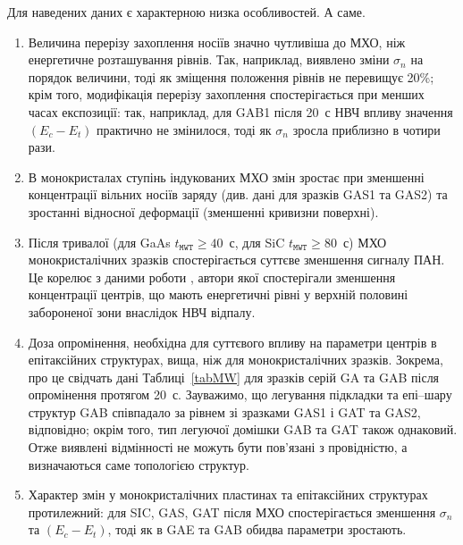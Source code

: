 \documentclass[a4paper,14pt,oneside,openany]{memoir}
\begin{document}
Для наведених даних є характерною низка особливостей.
А саме.
\begin{enumerate}[label=\arabic*),leftmargin=0em,itemindent=1.5em]
\item Величина перерізу захоплення носіїв значно чутливіша до МХО, ніж енергетичне розташування рівнів.
Так, наприклад, виявлено зміни $\sigma_n$ на порядок величини, тоді як зміщення положення рівнів не перевищує 20\%;
крім того, модифікація перерізу захоплення спостерігається при менших часах експозиції: так, наприклад,
для GAB1 після 20~с НВЧ впливу значення $(E_c-E_t)$ практично не змінилося, тоді як $\sigma_n$ зросла приблизно в чотири рази.

\item В монокристалах ступінь індукованих МХО змін зростає при зменшенні концентрації вільних носіїв заряду (див. дані для зразків GAS1 та GAS2) та зростанні відносної деформації (зменшенні кривизни поверхні).

\item Після тривалої (для GaAs $t_\mathtt{MWT}\geq40$~с, для SiC $t_\mathtt{MWT}\geq80$~с) МХО монокристалічних
зразків спостерігається суттєве зменшення сигналу ПАН.
Це корелює з даними роботи \cite{Belyaev1998JTFr}, автори якої спостерігали зменшення концентрації центрів, що
мають енергетичні рівні у верхній половині забороненої зони внаслідок НВЧ відпалу.

\item Доза опромінення, необхідна для суттєвого впливу на параметри центрів в епітаксійних структурах, вища, ніж
для монокристалічних зразків.
Зокрема, про це свідчать дані Таблиці~\ref{tabMW} для зразків серій GA та GAB після опромінення протягом 20~с.
Зауважимо, що легування підкладки та епі--шару структур GAB співпадало за рівнем зі зразками GAS1 і GAT та GAS2, відповідно; окрім того, тип легуючої домішки  GAB та GAT також однаковий.
Отже виявлені відмінності не можуть бути пов'язані з провідністю, а визначаються саме топологією структур.

\item Характер змін у монокристалічних пластинах та епітаксійних структурах протилежний:
для SIC, GAS, GAT після МХО спостерігається зменшення $\sigma_n$ та $(E_c-E_t)$, тоді як в GAE та GAB обидва параметри зростають.
\end{enumerate}
\end{document}
